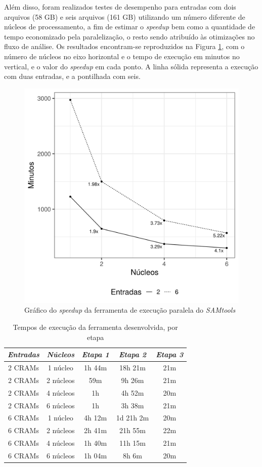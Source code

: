 \documentclass[cic,tc]{iiufrgs}
\begin{document}
Além disso, foram realizados testes de desempenho para entradas com dois arquivos
(58 GB) e seis arquivos (161 GB) utilizando um número diferente de núcleos de
processamento, a fim de estimar o \textit{speedup} bem como a quantidade de
tempo economizado pela paralelização, o resto sendo atribuído às otimizações no
fluxo de análise. Os resultados encontram-se reproduzidos na Figura
\ref{fig:speedup}, com o número de núcleos no eixo horizontal e o tempo de
execução em minutos no vertical, e o valor do \textit{speedup} em cada ponto. A
linha sólida representa a execução com duas entradas, e a pontilhada com seis.

\begin{figure}
  \caption{Gráfico do \textit{speedup} da ferramenta de execução paralela do \textit{SAMtools}}
    \begin{center}
      \includegraphics[width=0.55\linewidth]{img/speedup.png}
    \end{center}
    \label{fig:speedup}
\end{figure}

\begin{table}[h]
    \caption{Tempos de execução da ferramenta desenvolvida, por etapa}
    \centering
        \begin{tabular}{c|c|c|c|c}
          \hline
          \textit{Entradas}  & \textit{Núcleos} & \textit{Etapa 1}  & \textit{Etapa 2} & \textit{Etapa 3} \\
          \hline
          \hline
          2 CRAMs & 1 núcleo  & 1h 44m &    18h 21m & 21m \\
          2 CRAMs & 2 núcleos &    59m &     9h 26m & 21m \\
          2 CRAMs & 4 núcleos & 1h     &     4h 52m & 20m \\
          2 CRAMs & 6 núcleos & 1h     &     3h 38m & 21m \\
          6 CRAMs & 1 núcleo  & 4h 12m & 1d 21h  2m & 20m \\
          6 CRAMs & 2 núcleos & 2h 41m &    21h 55m & 22m \\
          6 CRAMs & 4 núcleos & 1h 40m &    11h 15m & 21m \\
          6 CRAMs & 6 núcleos & 1h 04m &     8h  6m & 20m \\
          \hline
        \end{tabular}
    \label{tbl:stages}
\end{table}
\end{document}
